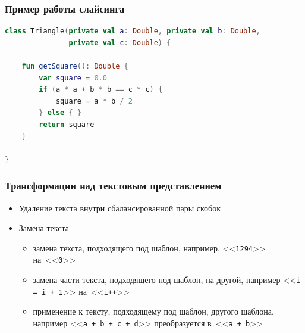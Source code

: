 
\begin{frame}[fragile]
	\frametitle{Пример работы слайсинга}
	\tiny
	\begin{lstlisting}[language = Kotlin]
class Triangle(private val a: Double, private val b: Double, 
               private val c: Double) {

    fun getSquare(): Double {
        var square = 0.0
        if (a * a + b * b == c * c) {
            square = a * b / 2
        } else { }
        return square
    }

}
\end{lstlisting}
\end{frame}


\begin{frame}
	\frametitle{Трансформации над текстовым представлением}
		\begin{itemize}
			\item Удаление текста внутри сбалансированной пары скобок
			\item Замена текста
			\begin{itemize}
				\item замена текста, подходящего под шаблон, например, <<\texttt{1294}>> на~<<\texttt{0}>> 
				\item замена части текста, подходящего под шаблон, на другой, например <<\texttt{i = i + 1}>> на~<<\texttt{i++}>>
				\item применение к тексту, подходящему под шаблон, другого шаблона, например <<\texttt{a + b + c + d}>> преобразуется в~<<\texttt{a + b}>>
\end{itemize}
		\end{itemize}
\end{frame}



